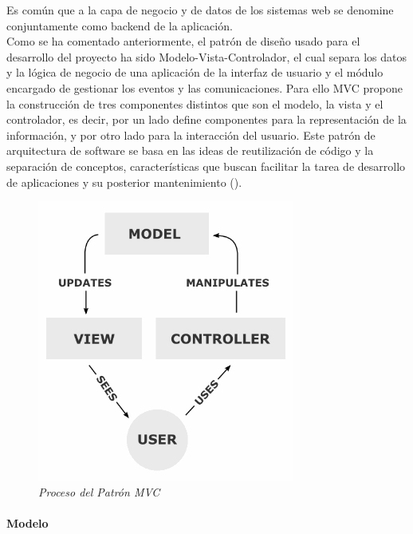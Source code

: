 Es común que a la capa de negocio y de datos de los sistemas web se denomine conjuntamente como backend de la aplicación.\\

Como se ha comentado anteriormente, el patrón de diseño usado para el desarrollo del proyecto ha sido Modelo-Vista-Controlador, el cual separa los datos y la lógica de negocio de una aplicación de la interfaz de usuario y el módulo encargado de gestionar los eventos y las comunicaciones. Para ello MVC propone la construcción de tres componentes distintos que son el modelo, la vista y el controlador, es decir, por un lado define componentes para la representación de la información, y por otro lado para la interacción del usuario.​ Este patrón de arquitectura de software se basa en las ideas de reutilización de código y la separación de conceptos, características que buscan facilitar la tarea de desarrollo de aplicaciones y su posterior mantenimiento (\cite{ModeloVistaControlador}).

\vspace{10mm}

\begin{figure}[H]
\centering
  \includegraphics[scale=.55]{img/proceso-MVC.jpg}
  \caption{\textit{Proceso del Patrón MVC}}
  \label{fig:proceso-MVC}
\end{figure}

\vspace{10mm}

\paragraph*{Modelo}

